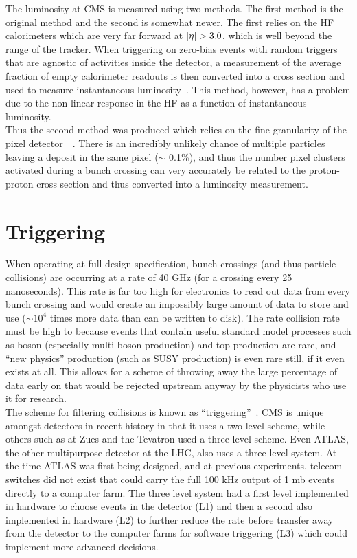 The luminosity at CMS is measured using two methods. The first method is the original method and the second is somewhat newer. The first relies on the HF calorimeters which are very far forward at $|\eta| > 3.0$, which is well beyond the range of the tracker. When triggering on zero-bias events with random triggers that are agnostic of activities inside the detector, a measurement of the average fraction of empty calorimeter readouts is then converted into a cross section and used to measure instantaneous luminosity~\cite{lumi11}. This method, however, has a problem due to the non-linear response in the HF as a function of instantaneous luminosity.\\

Thus the second method was produced which relies on the fine granularity of the pixel detector~\cite{lumi12}~\cite{lumi12up}. There is an incredibly unlikely chance of multiple particles leaving a deposit in the same pixel ($\sim$ 0.1\%), and thus the number pixel clusters activated during a bunch crossing can very accurately be related to the proton-proton cross section and thus converted into a luminosity measurement.\\
				
	\section{Triggering}       
	When operating at full design specification, bunch crossings (and thus particle collisions) are occurring at a rate of 40 GHz (for a crossing every 25 nanoseconds). This rate is far too high for electronics to read out data from every bunch crossing and would create an impossibly large amount of data to store and use ($\sim 10^4$ times more data than can be written to disk). The rate collision rate must be high to because events that contain useful standard model processes such as boson (especially multi-boson production) and top production are rare, and ``new physics'' production (such as SUSY production) is even rare still, if it even exists at all. This allows for a scheme of throwing away the large percentage of data early on that would be rejected upstream anyway by the physicists who use it for research.\\
	
	The scheme for filtering collisions is known as ``triggering''~\cite{triggertdr1}. CMS is unique amongst detectors in recent history in that it uses a two level scheme, while others such as at Zues and the Tevatron used a three level scheme. Even ATLAS, the other multipurpose detector at the LHC, also uses a three level system. At the time ATLAS was first being designed, and at previous experiments, telecom switches did not exist that could carry the full 100 kHz output of 1 mb events directly to a computer farm. The three level system had a first level implemented in hardware to choose events in the detector (L1) and then a second also implemented in hardware (L2) to further reduce the rate before transfer away from the detector to the computer farms for software triggering (L3) which could implement more advanced decisions.\\
	
